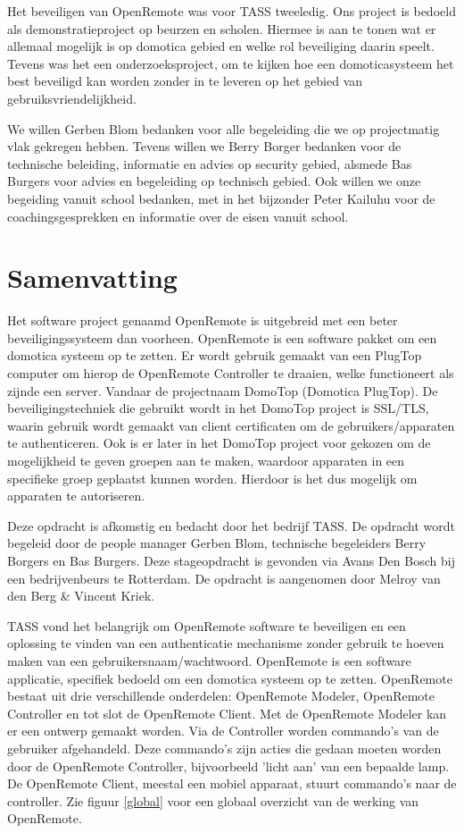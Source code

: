 \documentclass[]{article}
\begin{document}
Het beveiligen van OpenRemote was voor TASS tweeledig. Ons project is bedoeld als
demonstratieproject op beurzen en scholen. Hiermee is aan te tonen wat er
allemaal mogelijk is op domotica gebied en welke rol beveiliging daarin speelt.
Tevens was het een onderzoeksproject, om te kijken hoe een domoticasysteem
het best beveiligd kan worden zonder in te leveren op het gebied van
gebruiksvriendelijkheid.

We willen Gerben Blom bedanken voor alle begeleiding die we op projectmatig vlak
gekregen hebben. Tevens willen we Berry Borger bedanken voor de technische
beleiding, informatie en advies op security gebied, alsmede Bas Burgers voor advies en begeleiding op technisch gebied. Ook willen we onze
begeiding vanuit school bedanken, met in het bijzonder Peter Kailuhu voor
de coachingsgesprekken en informatie over de eisen vanuit school.

\newpage
\section*{Samenvatting}
Het software project genaamd OpenRemote is uitgebreid met een beter
beveiligingssysteem dan voorheen. OpenRemote is een software
pakket om een domotica systeem op te zetten. Er wordt gebruik gemaakt van
een PlugTop computer om hierop de OpenRemote Controller te draaien, welke functioneert als
zijnde een server. Vandaar de projectnaam DomoTop (Domotica PlugTop).
De beveiligingstechniek die gebruikt wordt in het DomoTop project is SSL/TLS,
waarin gebruik wordt gemaakt van client certificaten om de
gebruikers/apparaten te authenticeren. Ook is er later in het DomoTop project
voor gekozen om de mogelijkheid te geven groepen aan te maken, waardoor
apparaten in een specifieke groep geplaatst kunnen worden. Hierdoor
is het dus mogelijk om apparaten te autoriseren.

Deze opdracht is afkomstig en bedacht door het bedrijf TASS. De opdracht wordt
begeleid door de people manager Gerben Blom, technische begeleiders Berry
Borgers en Bas Burgers. Deze stageopdracht is gevonden via Avans Den
Bosch bij een bedrijvenbeurs te Rotterdam. De opdracht is aangenomen door
Melroy van den Berg \& Vincent Kriek.

TASS vond het belangrijk om OpenRemote software te beveiligen en een oplossing
te vinden van een authenticatie mechanisme zonder gebruik te hoeven maken van
een gebruikersnaam/wachtwoord. OpenRemote is een software
applicatie, specifiek bedoeld om een domotica systeem op te zetten. OpenRemote
bestaat uit drie verschillende onderdelen: OpenRemote Modeler, OpenRemote
Controller en tot slot de OpenRemote Client. Met de OpenRemote Modeler kan er een ontwerp
gemaakt worden. Via de Controller worden commando's van de gebruiker
afgehandeld. Deze commando's zijn acties die gedaan moeten worden door de
OpenRemote Controller, bijvoorbeeld 'licht aan' van een bepaalde lamp. De OpenRemote Client, meestal een mobiel apparaat, stuurt
commando's naar de controller. Zie figuur \ref{global} voor een globaal overzicht van de
werking van OpenRemote.
\end{document}
